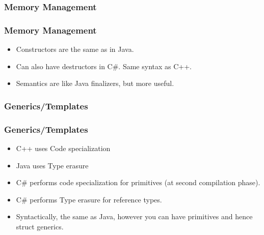 \documentclass{beamer}
\begin{document}
\subsubsection{Memory Management}
\begin{frame}
\frametitle{Memory Management}
\begin{itemize}
\item Constructors are the same as in Java.
\item Can also have destructors in C\#. Same syntax as C++.
\item Semantics are like Java finalizers, but more useful.
\end{itemize}
\end{frame}
\subsubsection{Generics/Templates}
\begin{frame}
\frametitle{Generics/Templates}
\begin{itemize}
\item C++ uses {\color{green} Code specialization}
\item Java uses {\color{red} Type erasure}
\item C\# performs {\color{green} code specialization} for primitives (at second compilation phase).
\item C\# performs {\color{red} Type erasure} for reference types.
\item Syntactically, the same as Java, however you can have primitives and hence struct generics.
\end{itemize}
\generics
\end{frame}
\end{document}
